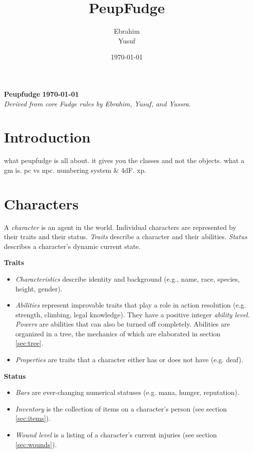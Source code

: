 \documentclass[12pt]{article}
\title{PeupFudge}
\author{Ebrahim \\ Yusuf}
\date{\today}
\newcommand{\notes}[1]{{\color{Tan} #1}}
\begin{document}
\textbf{Peupfudge}
\hfill
\textbf{\today}\\
\textit{Derived from core Fudge rules by Ebrahim, Yusuf, and Yussra.}

\section{Introduction}
\notes{what peupfudge is all about. it gives you the classes and not the objects. what a gm is. pc vs npc. numbering system \& 4dF. xp.}

\section{Characters}
A \emph{character} is an agent in the world.
Individual characters are represented by their traits and their status.
\emph{Traits} describe a character and their abilities.
\emph{Status} describes a character's dynamic current state.

\textbf{Traits}\vspace{-6mm}
\begin{itemize}
\item \emph{Characteristics}
describe identity and background
(e.g., name, race, species, height, gender).
\item \emph{Abilities}
represent improvable traits that play a role in action resolution
(e.g. strength, climbing, legal knowledge).
They have a positive integer \emph{ability level}.
\emph{Powers} are abilities that can also be turned off completely.
Abilities are organized in a tree, the mechanics of which are elaborated in section \ref{sec:tree}.
\item \emph{Properties} are traits that a character either has or does not have (e.g. deaf).
\end{itemize}

\textbf{Status}\vspace{-6mm}
\begin{itemize}
\item \emph{Bars} are ever-changing numerical statuses (e.g. mana, hunger, reputation).
\item \emph{Inventory} is the collection of items on a character's person (see section \ref{sec:items}).
\item \emph{Wound level} is a listing of a character's current injuries (see section \ref{sec:wounds}).
\end{itemize}
\end{document}
